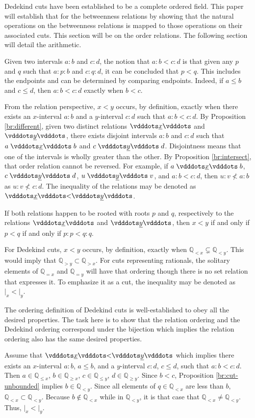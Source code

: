 \documentclass[12pt]{article}
\newcommand{\qcut}[2][x]{\ensuremath{\mathbb{Q}_{#2 #1}}}
\newcommand{\qlt}[1][x]{\qcut[#1]{<}}
\newcommand{\qeq}[1][x]{\qcut[#1]{=}}
\newcommand{\qgt}[1][x]{\qcut[#1]{>}}
\newcommand{\qgeq}[1][x]{\qcut[#1]{\geq}}
\newcommand{\qleq}[1][x]{\qcut[#1]{\leq}}
\newcommand{\cut}[1][x]{{\vert}_{#1} }
\newcommand{\yrel}{\xrel[y]}
\begin{document}
Dedekind cuts have been established to be a complete ordered field. This paper will establish that for the betweenness relations by showing that the natural operations on the betweenness relations is mapped to those operations on their associated cuts. This section will be on the order relations. The following section will detail the arithmetic. 

Given two intervals $a:b$ and $c:d$, the notion that $a:b < c:d$ is that given any $p$ and $q$ such that $a:p:b$ and $c:q:d$, it can be concluded that $p < q$. This includes the endpoints and can be determined by comparing endpoints. Indeed, if $a\leq b$ and $c \leq d$, then $a:b < c:d$ exactly when $b < c$. 

From the relation perspective, $x < y$ occurs, by definition, exactly when there exists an $x$-interval $a:b$ and a $y$-interval $c:d$ such that $a:b < c:d$. By Proposition \ref{br:different}, given two distinct relations $\xrel$ and $\yrel$, there exists disjoint intervals $a:b$ and $c:d$ such that $a \xrel b$ and $c \yrel d$. Disjointness means that one of the intervals is wholly greater than the other. By Proposition \ref{br:intersect}, that order relation cannot be reversed. For example, if $a \xrel b$, $c \xrel[y] d$, $u \yrel v$, and $a:b < c:d$, then $u:v \nless a:b$ as $u:v \nless c:d$.  The inequality of the relations may be denoted as $\xrel < \yrel$. 

If both relations happen to be  rooted with roots $p$ and $q$, respectively to the relations $\xrel$ and $\yrel$, then $x<y$ if and only if $p < q$ if and only if $p:p < q:q$. 

For Dedekind cuts, $x < y$ occurs, by definition, exactly when $\qlt \subsetneq \qlt[y]$. This would imply that $\qgt[y] \subset \qgt$. For cuts representing rationals, the solitary elements of $\qeq$ and $\qeq[y]$ will have that ordering though there is no set relation that expresses it. To emphasize it as a cut, the inequality may be denoted as $\cut < \cut[y]$.

The ordering definition of Dedekind cuts is well-established to obey all the desired properties. The task here is to show that the relation ordering and the Dedekind ordering correspond under the bijection which implies the relation ordering also has the same desired properties. 

Assume that $\xrel < \yrel$ which implies there exists an $x$-interval $a:b$, $a \leq b$,  and a $y$-interval $c:d$, $c \leq d$, such that $a:b < c:d$. Then $a \in \qleq$, $b \in \qgeq$, $c \in \qleq[y]$, $d \in \qgeq[y]$. Since $ b< c$, Proposition \ref{br:cut-unbounded} implies $b \in \qlt[y]$. Since all elements of $q \in \qlt$ are less than $b$, $\qlt \subset \qlt[y]$. Because $b\notin \qlt$ while in $\qlt[y]$, it is that case that $\qlt \neq \qlt[y]$. Thus,  $\cut < \cut[y]$. 
\end{document}
